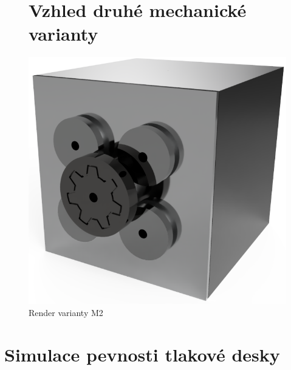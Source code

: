 \begin{figure}
	\section{Vzhled druhé mechanické varianty}
	\vspace{\OdsazeniNadpisu}
    \centering
    \includegraphics[width=\textwidth]{kapitoly/obrazky/M2/predni_render.PNG}
    \caption{Render varianty M2}
    \label{fig:M2-render}
\end{figure}

\section{Simulace pevnosti tlakové desky}

